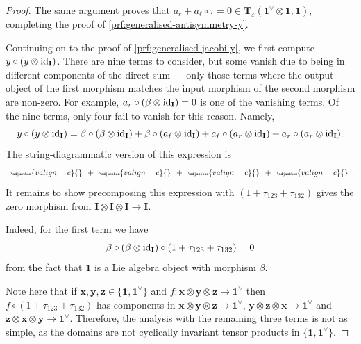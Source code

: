 \begin{proof}
	The same argument proves that \(a_{r} + a_{\ell} \circ \tau = 0 \in \mathbf{T}_{\varepsilon}(\mathbf{1}^{\vee} \otimes \mathbf{1}, \mathbf{1})\), completing the proof of \ref{prf:generalised-antisymmetry-y}.

	Continuing on to the proof of \ref{prf:generalised-jacobi-y}, we first compute \(y \circ (y \otimes \mathrm{id}_{\mathbf{I}})\). There are nine terms to consider, but some vanish due to being in different components of the direct sum --- only those terms where the output object of the first morphism matches the input morphism of the second morphism are non-zero. For example, \(a_{r} \circ (\beta \otimes \mathrm{id}_{\mathbf{I}}) = 0\) is one of the vanishing terms. Of the nine terms, only four fail to vanish for this reason. Namely,
	\[
		y \circ (y \otimes \mathrm{id}_{\mathbf{I}})
		=
		\beta \circ (\beta \otimes \mathrm{id}_{\mathbf{I}})
		+
		\beta \circ (a_{\ell} \otimes \mathrm{id}_{\mathbf{I}})
		+
		a_{\ell} \circ (a_{r} \otimes \mathrm{id}_{\mathbf{I}})
		+
		a_{r} \circ (a_{r} \otimes \mathrm{id}_{\mathbf{I}})
		.
	\]
	The string-diagrammatic version of this expression is
	\[
		\mspace{9mu}
		{\tiny
		\def\svgscale{0.30}
		\adjustbox{valign=c}{}
		}
		\mspace{9mu}
		+
		\mspace{9mu}
		{\tiny
		\def\svgscale{0.30}
		\adjustbox{valign=c}{}
		}
		\mspace{9mu}
		+
		\mspace{9mu}
		{\tiny
		\def\svgscale{0.30}
		\adjustbox{valign=c}{}
		}
		\mspace{9mu}
		+
		\mspace{9mu}
		{\tiny
		\def\svgscale{0.30}
		\adjustbox{valign=c}{}
		}
		\mspace{9mu}
		.
	\]
	It remains to show precomposing this expression with \((1 + \tau_{123} + \tau_{132})\) gives the zero morphism from \(\mathbf{I} \otimes \mathbf{I} \otimes \mathbf{I} \to \mathbf{I}\).

	Indeed, for the first term we have
	\[\beta \circ (\beta \otimes \mathrm{id}_{\mathbf{I}}) \circ (1 + \tau_{123} + \tau_{132})  = 0\]
	from the fact that \(\mathbf{1}\) is a Lie algebra object with morphism \(\beta\).

	Note here that if \(\mathbf{x}, \mathbf{y}, \mathbf{z} \in \{\mathbf{1}, \mathbf{1}^{\vee}\}\) and \(f: \mathbf{x} \otimes \mathbf{y} \otimes \mathbf{z} \to \mathbf{1}^{\vee}\) then \(f \circ (1 + \tau_{123} + \tau_{132})\) has components in \(\mathbf{x} \otimes \mathbf{y} \otimes \mathbf{z} \to \mathbf{1}^{\vee}\), \(\mathbf{y} \otimes \mathbf{z} \otimes \mathbf{x} \to \mathbf{1}^{\vee}\) and \(\mathbf{z} \otimes \mathbf{x} \otimes \mathbf{y} \to \mathbf{1}^{\vee}\). Therefore, the analysis with the remaining three terms is not as simple, as the domains are not cyclically invariant tensor products in \(\{\mathbf{1}, \mathbf{1}^{\vee}\}\).


\end{proof}
